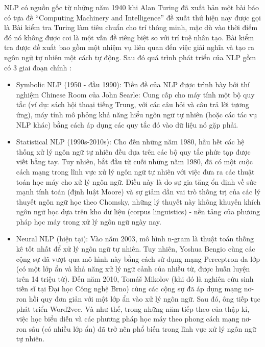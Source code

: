 NLP có nguồn gốc từ những năm 1940 khi Alan Turing đã xuất bản một bài báo có tựa đề ``Computing Machinery and Intelligence'' đề xuất thứ hiện nay được gọi là Bài kiểm tra Turing làm tiêu chuẩn cho trí thông minh, mặc dù vào thời điểm đó nó không được coi là một vấn đề riêng biệt so với trí tuệ nhân tạo. Bài kiểm tra được đề xuất bao gồm một nhiệm vụ liên quan đến việc giải nghĩa và tạo ra ngôn ngữ tự nhiên một cách tự động. Sau đó quá trình phát triển của NLP gồm có 3 giai đoạn chính \cite{webpage24}:
\begin{itemize}
    \item Symbolic NLP (1950 - đầu 1990): Tiền đề của NLP được trình bày bởi thí nghiệm Chinese Room của John Searle: Cung cấp cho máy tính một bộ quy tắc (ví dụ: sách hội thoại tiếng Trung, với các câu hỏi và câu trả lời tương ứng), máy tính mô phỏng khả năng hiểu ngôn ngữ tự nhiên (hoặc các tác vụ NLP khác) bằng cách áp dụng các quy tắc đó vào dữ liệu nó gặp phải.
    \item Statistical NLP (1990s-2010s): Cho đến những năm 1980, hầu hết các hệ thống xử lý ngôn ngữ tự nhiên đều dựa trên các bộ quy tắc phức tạp được viết bằng tay. Tuy nhiên, bắt đầu từ cuối những năm 1980, đã có một cuộc cách mạng trong lĩnh vực xử lý ngôn ngữ tự nhiên với việc đưa ra các thuật toán học máy cho xử lý ngôn ngữ. Điều này là do sự gia tăng ổn định về sức mạnh tính toán (định luật Moore) và sự giảm dần vai trò thống trị của các lý thuyết ngôn ngữ học theo Chomsky, những lý thuyết này không khuyến khích ngôn ngữ học dựa trên kho dữ liệu (corpus linguistics) - nền tảng của phương pháp học máy trong xử lý ngôn ngữ ngày nay.
    \item Neural NLP (hiện tại): Vào năm 2003, mô hình n-gram là thuật toán thống kê tốt nhất để xử lý ngôn ngữ tự nhiên. Tuy nhiên, Yoshua Bengio cùng các cộng sự đã vượt qua mô hình này bằng cách sử dụng mạng Perceptron đa lớp (có một lớp ẩn và khả năng xử lý ngữ cảnh của nhiều từ, được huấn luyện trên 14 triệu từ). Đến năm 2010, Tomáš Mikolov (khi đó là nghiên cứu sinh tiến sĩ tại Đại học Công nghệ Brno) cùng các cộng sự đã áp dụng mạng nơ-ron hồi quy đơn giản với một lớp ẩn vào xử lý ngôn ngữ. Sau đó, ông tiếp tục phát triển Word2vec. Và như thế, trong những năm tiếp theo của thập kỉ, việc học biểu diễn và các phương pháp học máy theo phong cách mạng nơ-ron sâu (có nhiều lớp ẩn) đã trở nên phổ biến trong lĩnh vực xử lý ngôn ngữ tự nhiên. 
\end{itemize}

